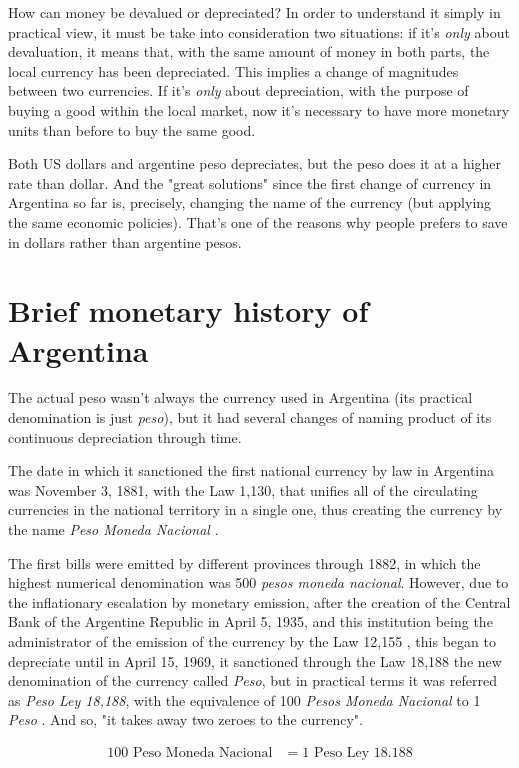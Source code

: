 \documentclass[12pt,a4paper,twoside]{book}
\begin{document}
How can money be devalued or depreciated? In order to understand it simply in practical view, it must be take into consideration two situations: if it's \textit{only} about devaluation, it means that, with the same amount of money in both parts, the local currency has been depreciated. This implies a change of magnitudes between two currencies. If it's \textit{only} about depreciation, with the purpose of buying a good within the local market, now it's necessary to have more monetary units than before to buy the same good.

Both US dollars and argentine peso depreciates, but the peso does it at a higher rate than dollar. And the "great solutions" since the first change of currency in Argentina so far is, precisely, changing the name of the currency (but applying the same economic policies). That's one of the reasons why people prefers to save in dollars rather than argentine pesos.

\section{Brief monetary history of Argentina}
The actual peso wasn't always the currency used in Argentina (its practical denomination is just \textit{peso}), but it had several changes of naming product of its continuous depreciation through time.

The date in which it sanctioned the first national currency by law in Argentina was November 3, 1881, with the Law 1,130, that unifies all of the circulating currencies in the national territory in a single one, thus creating the currency by the name \textit{Peso Moneda Nacional} \cite{dineroarg:pmn}.

The first bills were emitted by different provinces through 1882, in which the highest numerical denomination was 500 \textit{pesos moneda nacional}. However, due to the inflationary escalation by monetary emission, after the creation of the Central Bank of the Argentine Republic in April 5, 1935, and this institution being the administrator of the emission of the currency by the Law 12,155 \cite{dineroarg:bcra}, this began to depreciate until in April 15, 1969, it sanctioned through the Law 18,188 the new denomination of the currency called \textit{Peso}, but in practical terms it was referred as \textit{Peso Ley 18,188}, with the equivalence of 100 \textit{Pesos Moneda Nacional} to 1 \textit{Peso} \cite{dineroarg:18188}. And so, "it takes away two zeroes to the currency".

\begin{align*}
100 \text{ Peso Moneda Nacional} &= 1 \text{ Peso Ley 18.188}
\end{align*}
\end{document}
